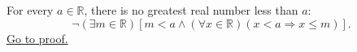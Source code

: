 \begin{theorem}\label{thm:no-immediate-predecessors-in-r}
For every $a\in\mathbb{R}$, there is no greatest real number less than $a$:
\[
  \neg(\exists m\in\mathbb{R})
  \left[
  m<a
  \land
  (\forall x\in\mathbb{R})(x<a\Longrightarrow x\leq m)
  \right].
\]
\hyperref[prf:no-immediate-predecessors-in-r]{Go to proof.}
\end{theorem}